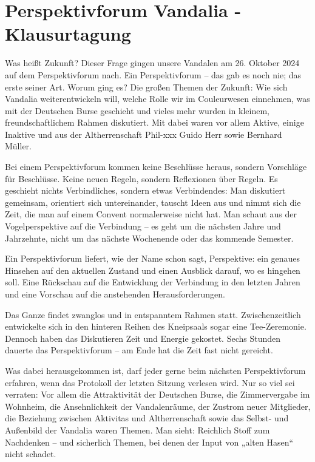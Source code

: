 \section{Perspektivforum Vandalia - Klausurtagung}


\begin{multicols}{2}	

Was heißt Zukunft? Dieser Frage gingen
unsere Vandalen am 26. Oktober 2024 auf dem Perspektivforum nach. Ein
Perspektivforum – das gab es noch nie; das erste seiner Art. Worum ging es? Die
großen Themen der Zukunft: Wie sich Vandalia weiterentwickeln will, welche
Rolle wir im Couleurwesen einnehmen, was mit der Deutschen Burse geschieht und
vieles mehr wurden in kleinem, freundschaftlichem Rahmen diskutiert. Mit dabei
waren vor allem Aktive, einige Inaktive und aus der Altherrenschaft Phil-xxx
Guido Herr sowie Bernhard Müller.

Bei einem Perspektivforum kommen keine
Beschlüsse heraus, sondern Vorschläge für Beschlüsse. Keine neuen Regeln,
sondern Reflexionen über Regeln. Es geschieht nichts Verbindliches, sondern
etwas Verbindendes: Man diskutiert gemeinsam, orientiert sich untereinander,
tauscht Ideen aus und nimmt sich die Zeit, die man auf einem Convent
normalerweise nicht hat. Man schaut aus der Vogelperspektive auf die Verbindung
– es geht um die nächsten Jahre und Jahrzehnte, nicht um das nächste Wochenende
oder das kommende Semester.

Ein Perspektivforum liefert, wie der Name
schon sagt, Perspektive: ein genaues Hinsehen auf den aktuellen Zustand und
einen Ausblick darauf, wo es hingehen soll. Eine Rückschau auf die Entwicklung
der Verbindung in den letzten Jahren und eine Vorschau auf die anstehenden
Herausforderungen.

Das Ganze findet zwanglos und in
entspanntem Rahmen statt. Zwischenzeitlich entwickelte sich in den hinteren
Reihen des Kneipsaals sogar eine Tee-Zeremonie. Dennoch haben das Diskutieren
Zeit und Energie gekostet. Sechs Stunden dauerte das Perspektivforum – am Ende
hat die Zeit fast nicht gereicht.

Was dabei herausgekommen ist, darf jeder
gerne beim nächsten Perspektivforum erfahren, wenn das Protokoll der letzten
Sitzung verlesen wird. Nur so viel sei verraten: Vor allem die Attraktivität
der Deutschen Burse, die Zimmervergabe im Wohnheim, die Ansehnlichkeit der
Vandalenräume, der Zustrom neuer Mitglieder, die Beziehung zwischen Aktivitas
und Altherrenschaft sowie das Selbst- und Außenbild der Vandalia waren Themen.
Man sieht: Reichlich Stoff zum Nachdenken – und sicherlich Themen, bei denen
der Input von „alten Hasen“ nicht schadet.


\end{multicols}
